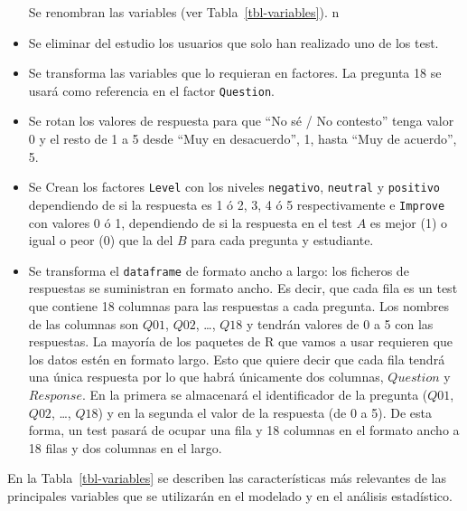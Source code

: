 \documentclass[
  12pt,
  a4paper,
  extrafontsizes,
  onecolumn,
  openright,
  table]{memoir}
\begin{document}
\begin{itemize}
  Se renombran las variables (ver Tabla~\ref{tbl-variables}). n
\item
  Se eliminar del estudio los usuarios que solo han realizado uno de los
  test.
\item
  Se transforma las variables que lo requieran en factores. La pregunta
  18 se usará como referencia en el factor \texttt{Question}.
\item
  Se rotan los valores de respuesta para que \enquote{No sé / No
  contesto} tenga valor 0 y el resto de 1 a 5 desde \enquote{Muy en
  desacuerdo}, 1, hasta \enquote{Muy de acuerdo}, 5.
\item
  Se Crean los factores \texttt{Level} con los niveles
  \texttt{negativo}, \texttt{neutral} y \texttt{positivo} dependiendo de
  si la respuesta es 1 ó 2, 3, 4 ó 5 respectivamente e \texttt{Improve}
  con valores 0 ó 1, dependiendo de si la respuesta en el test \(A\) es
  mejor (1) o igual o peor (0) que la del \(B\) para cada pregunta y
  estudiante.
\item
  Se transforma el \texttt{dataframe} de formato ancho a largo: los
  ficheros de respuestas se suministran en formato ancho. Es decir, que
  cada fila es un test que contiene 18 columnas para las respuestas a
  cada pregunta. Los nombres de las columnas son \(Q01\), \(Q02\),
  \ldots, \(Q18\) y tendrán valores de 0 a 5 con las respuestas. La
  mayoría de los paquetes de R que vamos a usar requieren que los datos
  estén en formato largo. Esto que quiere decir que cada fila tendrá una
  única respuesta por lo que habrá únicamente dos columnas, \(Question\)
  y \(Response\). En la primera se almacenará el identificador de la
  pregunta (\(Q01\), \(Q02\), \ldots, \(Q18\)) y en la segunda el valor
  de la respuesta (de 0 a 5). De esta forma, un test pasará de ocupar
  una fila y 18 columnas en el formato ancho a 18 filas y dos columnas
  en el largo.
\end{itemize}

En la Tabla~\ref{tbl-variables} se describen las características más
relevantes de las principales variables que se utilizarán en el modelado
y en el análisis estadístico.

\footnotesize
\end{document}
